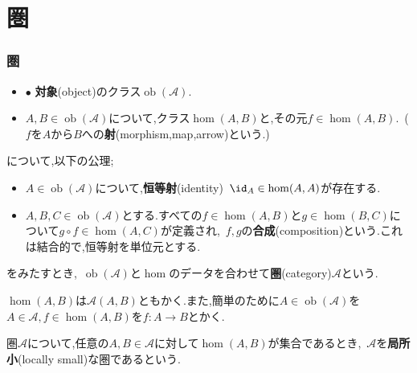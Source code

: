 \part[Appendix \thepart, Category theory]{圏}
\section{圏}

\begin{defi}[圏]
	\begin{itemize}
		\item $\bullet$ \textbf{対象}(object)のクラス$\operatorname{ob}(\mathscr{A})$.
		\item $A,B\in\operatorname{ob}(\mathscr{A})$について,クラス$\hom (A,B)$と,その元$f\in\hom(A,B).$~($f$を$A$から$B$への\textbf{射}(morphism,map,arrow)という.)
	\end{itemize}
	について,以下の公理;
	\begin{itemize}
		\item $A\in\operatorname{ob}(\mathscr{A})$について,\textbf{恒等射}(identity)~$\id_A\in\hom(A,A)$が存在する.
		\item $A,B,C\in\operatorname{ob}(\mathscr{A})$とする.すべての$f\in\hom(A,B)$と$g\in\hom(B,C)$について$g\circ f\in\hom(A,C)$が定義され,~$f,g$の\textbf{合成}(composition)という.これは結合的で,恒等射を単位元とする.
	\end{itemize}
	をみたすとき,~$\operatorname{ob}(\mathscr{A})$と$\hom$のデータを合わせて\textbf{圏}(category)$\mathscr{A}$という.
\end{defi}

$\hom(A,B)$は$\mathscr{A}(A,B)$ともかく.また,簡単のために$A\in\operatorname{ob}(\mathscr{A})$を$A\in\mathscr{A},f\in\hom(A,B)$を$f:A\to B$とかく.
{
	\makeatletter
	\renewcommand{\symlist}[2]{%
		\mbox{$#1$}%
		\setlength{\m@syu@length}{2.5cm}%
		\settowidth{\m@syu@length@}{\mbox{$#1$}}%
		\addtolength{\m@syu@length}{-\m@syu@length@}%
		\leaders\hbox{\normalfont$\m@th \mkern%
			\@dotsep mu\hbox{.}\mkern \@dotsep mu$}\hskip\m@syu@length
		#2\par
	}%
}
\begin{defi}[局所小]
	圏$\mathscr{A}$について,任意の$A,B\in\mathscr{A}$に対して$\hom(A,B)$が集合であるとき,~$\mathscr{A}$を\textbf{局所小}(locally small)な圏であるという.
\end{defi}

